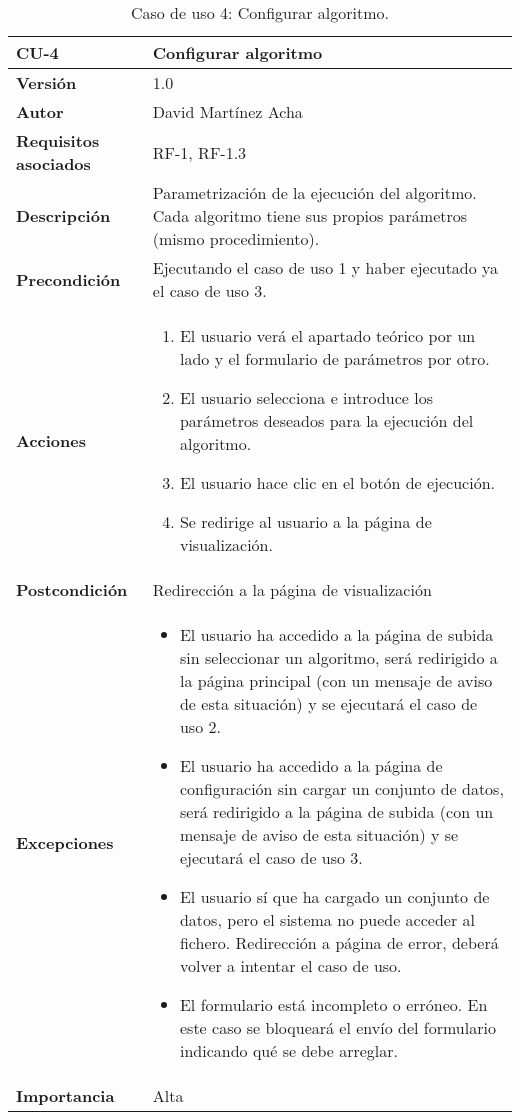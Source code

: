 \begin{table}[p]
	\centering
	\begin{tabularx}{\linewidth}{ p{} p{} }
		\toprule
		\textbf{CU-4}    & \textbf{Configurar algoritmo}\\
		\toprule
		\textbf{Versión}              & 1.0    \\
		\textbf{Autor}                & David Martínez Acha \\
		\textbf{Requisitos asociados} & RF-1, RF-1.3 \\
		\textbf{Descripción}          & Parametrización de la ejecución del algoritmo. Cada algoritmo tiene sus propios parámetros (mismo procedimiento). \\
		\textbf{Precondición}         & Ejecutando el caso de uso 1 y haber ejecutado ya el caso de uso 3. \\
		\textbf{Acciones}             &
		\begin{enumerate}
			\def\labelenumi{\arabic{enumi}.}
			\tightlist
			\item El usuario verá el apartado teórico por un lado y el formulario de parámetros por otro.
			\item El usuario selecciona e introduce los parámetros deseados para la ejecución del algoritmo.
			\item El usuario hace clic en el botón de ejecución.
			\item Se redirige al usuario a la página de visualización.
		\end{enumerate}\\
		\textbf{Postcondición}        & Redirección a la página de visualización \\
		\textbf{Excepciones}          & \begin{itemize}
			\item El usuario ha accedido a la página de subida sin seleccionar un algoritmo, será redirigido a la página principal (con un mensaje de aviso de esta situación) y se ejecutará el caso de uso 2.
			\item El usuario ha accedido a la página de configuración sin cargar un conjunto de datos, será redirigido a la página de subida (con un mensaje de aviso de esta situación) y se ejecutará el caso de uso 3.
			\item El usuario sí que ha cargado un conjunto de datos, pero el sistema no puede acceder al fichero. Redirección a página de error, deberá volver a intentar el caso de uso.
			\item El formulario está incompleto o erróneo. En este caso se bloqueará el envío del formulario indicando qué se debe arreglar.
		\end{itemize} \\
		\textbf{Importancia}          & Alta \\
		\bottomrule
	\end{tabularx}
	\caption{Caso de uso 4: Configurar algoritmo.}
\end{table}

